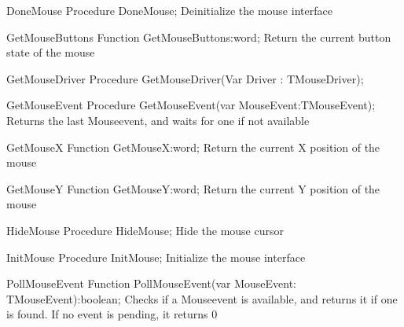 \begin{procedure}{DoneMouse}
\Declaration
Procedure DoneMouse;
\Description
 { Deinitialize the mouse interface }
\Errors
\SeeAlso
\end{procedure}

\begin{function}{GetMouseButtons}
\Declaration
Function GetMouseButtons:word;
\Description
 { Return the current button state of the mouse }
\Errors
\SeeAlso
\end{function}

\begin{procedure}{GetMouseDriver}
\Declaration
Procedure GetMouseDriver(Var Driver : TMouseDriver);
\Description
\Errors
\SeeAlso
\end{procedure}

\begin{procedure}{GetMouseEvent}
\Declaration
Procedure GetMouseEvent(var MouseEvent:TMouseEvent);
\Description
 { Returns the last Mouseevent, and waits for one if not available }
\Errors
\SeeAlso
\end{procedure}

\begin{function}{GetMouseX}
\Declaration
Function GetMouseX:word;
\Description
 { Return the current X position of the mouse }
\Errors
\SeeAlso
\end{function}

\begin{function}{GetMouseY}
\Declaration
Function GetMouseY:word; 
\Description
{ Return the current Y position of the mouse }
\Errors
\SeeAlso
\end{function}

\begin{procedure}{HideMouse}
\Declaration
Procedure HideMouse;
\Description
 { Hide the mouse cursor }
\Errors
\SeeAlso
\end{procedure}

\begin{procedure}{InitMouse}
\Declaration
Procedure InitMouse;
\Description
 { Initialize the mouse interface }
\Errors
\SeeAlso
\end{procedure}

\begin{function}{PollMouseEvent}
\Declaration
Function PollMouseEvent(var MouseEvent: TMouseEvent):boolean; 
\Description
{ Checks if a Mouseevent is available, and returns it if one is found. If no   event is pending, it returns 0 }
\Errors
\SeeAlso
\end{function}

